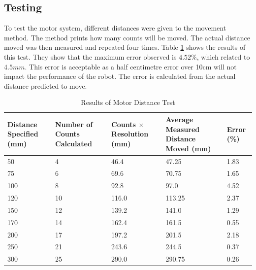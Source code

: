 \subsection{Testing}\label{Section:MotorTest}

To test the motor system, different distances were given to the movement method. The method prints how many counts will be moved. The actual distance moved was then measured and repeated four times. Table \ref{table:results:motor:distance} shows the results of this test. They show that the maximum error observed is $4.52\%$, which related to $4.5mm$. This error is acceptable as a half centimetre error over 10cm will not impact the performance of the robot. The error is calculated from the actual distance predicted to move. 


\begin{table}
\caption{Results of Motor Distance Test}
\label{table:results:motor:distance}
\begin{tabular}{p{2.5cm}p{2.5cm}p{2.5cm}p{2.5cm}p{2.5cm}} \toprule
Distance Specified (mm) &	Number of Counts Calculated	& 	Counts $\times$ Resolution (mm)	& 	Average Measured Distance Moved (mm)	&	Error (\%) \\ \toprule
50						&	4							&	46.4							&	47.25									&	1.83		\\ \midrule
75						&	6							&	69.6							&	70.75									&	1.65		\\ \midrule
100						&	8							&	92.8							&	97.0									&	4.52		\\ \midrule
120						&	10							&	116.0							&	113.25									&	2.37		\\ \midrule
150						&	12							&	139.2							&	141.0									&	1.29		\\ \midrule
170						&	14							&	162.4							&	161.5									&	0.55		\\ \midrule
200						&	17							&	197.2							&	201.5									&	2.18		\\ \midrule
250						&	21							&	243.6							&	244.5									&	0.37		\\ \midrule
300						&	25							&	290.0							&	290.75									&	0.26		\\ \bottomrule
\end{tabular}
\end{table}



